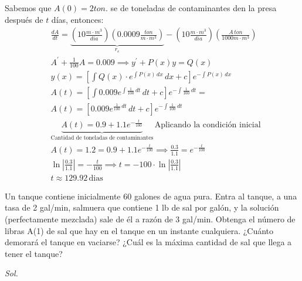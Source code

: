 Sabemos que $A(0)=2ton$. se de toneladas de contaminantes den la presa después de $t$ días, entonces: 
\begin{align*}
    &\frac{dA}{dt}=\underbrace{\left(10\frac{m\cdot m^3}{dia}\right)\left(0.0009\frac{ton}{m\cdot m^3}\right)}_{r_e}-\left(10\frac{m\cdot m^3}{dia}\right)\left(\frac{A\, ton}{1000m\cdot m^3}\right)\\
    &A^{\prime}+\frac{1}{100}A=0.009\implies y^{\prime}+P(x)y=Q(x)\\
    &y(x)=\left[\int Q(x)\cdot e^{\int P(x)\, dx}\,dx+c\right]e^{-\int P(x)\, dx}\\
    &A(t)=\left[\int 0.009e^{\int \frac{1}{100}\, dt}\, dt+c \right]e^{-\int \frac{1}{100}\, dt}=\\
    &A(t)=\left[0.009e^{\frac{1}{100}\, dt}\, dt+c\right]e^{-\int \frac{1}{100}\, dt}\\
    &\underbrace{A(t)=0.9+1.1e^{-\frac{t}{100}}}_{\text{Cantidad de toneladas de contaminantes}}\, \text{Aplicando la condición inicial}\\
    &A(t)=1.2=0.9+1.1e^{-\frac{t}{100}}\implies \frac{0.3}{1.1}=e^{-\frac{t}{100}}\\
    &\ln{\left\lvert \frac{0.3}{1.1}\right\rvert}=-\frac{t}{100}\implies t=-100\cdot \ln{\left\lvert \frac{0.3}{1.1}\right\rvert}\\
    &t\approx 129.92\, \text{dias}
\end{align*}

\begin{example}
    Un tanque contiene inicialmente 60 galones de agua pura. Entra al tanque, a una tasa de 2 gal/min, salmuera que contiene 1 lb de sal por galón, y la solución (perfectamente mezclada) sale de él a razón de 3 gal/min. Obtenga el número de libras A(1) de sal que hay en el tanque en un instante cualquiera. ¿Cuánto demorará el tanque en vaciarse? ¿Cuál es la máxima cantidad de sal que llega a tener el tanque?
\end{example}

\textit{ Sol. }

